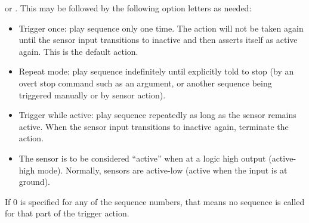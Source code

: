 \begin{list}{}{}
or
.
This may be followed by the following option letters as needed:
\begin{itemize}
\item[{\codetype{o}}]
Trigger once: play sequence
only one time.  The action will not be taken again until the sensor
input transitions to inactive and then asserts itself as active again.
This is the default action.
\item[{\codetype{r}}]
Repeat mode: play sequence
indefinitely until explicitly told to stop (by an overt stop command
such as an
argument, or another sequence being triggered manually or by sensor
action).
\item[{\codetype{w}}]
Trigger while active: play sequence
repeatedly as long as the sensor remains active.  When the sensor input
transitions to inactive again, terminate the action.
\item[{\codetype{+}}]
The sensor is to be considered ``active'' when at a logic
high output (active-high mode).  Normally, sensors are active-low
(active when the input is at ground).
\end{itemize}


If 0 is specified for any of the sequence numbers, that means no
sequence is called for that part of the trigger action.



\end{list}
